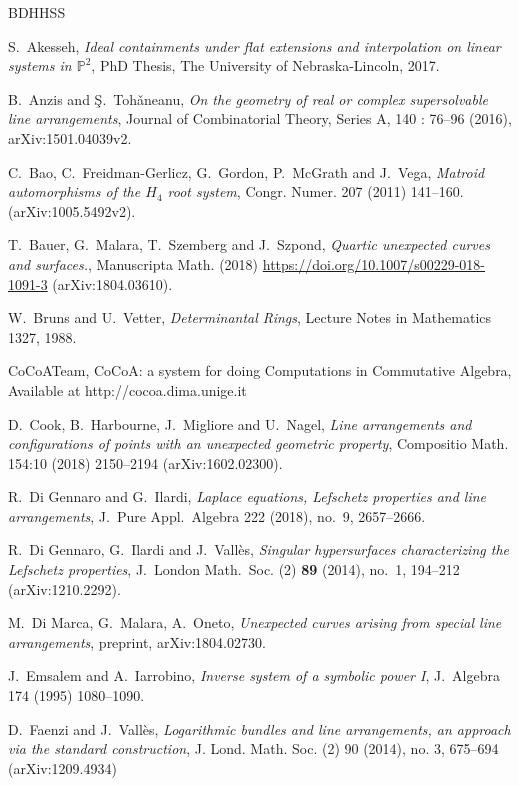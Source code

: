 \documentclass[12pt]{amsart}
\numberwithin{equation}{section}
\theoremstyle{definition}
\newcommand{\PP}{ \ensuremath{\mathbb{P}}}
\begin{document}
\begin{thebibliography}{BDHHSS}

S.\ Akesseh, {\em Ideal containments under flat extensions and interpolation on linear systems in $\PP^2$}, 
PhD Thesis, The University of Nebraska-Lincoln, 2017.

B.\ Anzis and \c{S}.\ Toh\v{a}neanu, {\em On the geometry of real or complex supersolvable line arrangements}, 
Journal of Combinatorial Theory, Series A, 140 : 76--96 (2016), arXiv:1501.04039v2.

C.\ Bao, C.\ Freidman-Gerlicz, G.\ Gordon, P.\ McGrath and J.\ Vega,
{\em Matroid automorphisms of the $H_4$ root system}, Congr. Numer. 207 (2011) 141--160.
(arXiv:1005.5492v2).

T.\ Bauer, G.\ Malara, T.\ Szemberg and J.\ Szpond, 
{\em Quartic unexpected curves and surfaces.}, 
Manuscripta Math. (2018) \url{https://doi.org/10.1007/s00229-018-1091-3} (arXiv:1804.03610). 

W.\ Bruns and U.\ Vetter,
{\em Determinantal Rings},
Lecture Notes in Mathematics 1327, 1988.

   CoCoATeam,
  CoCoA: a system for doing
     Computations in Commutative Algebra,
  Available at http://cocoa.dima.unige.it

D.\ Cook, B.\ Harbourne, J.\ Migliore and U.\ Nagel, 
{\em Line arrangements and configurations of points with an unexpected geometric property}, 
Compositio Math. 154:10 (2018) 2150--2194 (arXiv:1602.02300). 

R.\ Di Gennaro and G.\ Ilardi, 
{\em Laplace equations, Lefschetz properties and line arrangements}, 
J.\ Pure Appl.\ Algebra 222 (2018), no.\ 9, 2657--2666.

R.\ Di Gennaro, G.\ Ilardi and J.\ Vall\`es,  
{\em Singular hypersurfaces characterizing the Lefschetz properties}, 
J.\ London Math.\ Soc. (2) {\bf 89} (2014), no.\ 1, 194--212 (arXiv:1210.2292).

M.\ Di Marca, G.\ Malara, A.\ Oneto, {\em Unexpected curves arising from special line arrangements}, preprint, arXiv:1804.02730.

J.\ Emsalem and A.\ Iarrobino, 
{\em Inverse system of a symbolic power I}, J.\ Algebra 174 (1995) 1080--1090.

D.\ Faenzi and J.\ Vall\`es, {\em Logarithmic bundles and line arrangements, an approach via the standard construction},
J. Lond. Math. Soc. (2) 90 (2014), no. 3, 675--694 (arXiv:1209.4934)


\end{thebibliography}
\end{document}
